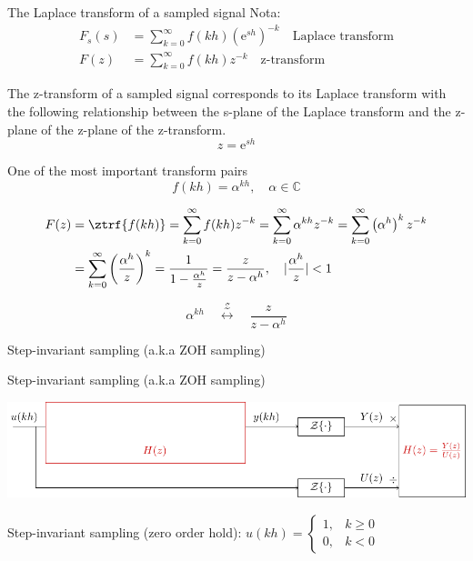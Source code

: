 \documentclass[presentation,aspectratio=169]{beamer}
\begin{document}
\begin{frame}[label={sec:orgb66f656}]{The Laplace transform of a sampled signal}
Nota:
\begin{align*}
F_s(s) &=  \sum_{k=0}^{\infty} f(kh) \left(\mathrm{e}^{sh}\right)^{-k}\quad \text{Laplace transform}\\
F(z) &= \sum_{k=0}^{\infty} f(kh) z^{-k} \quad \text{z-transform}
\end{align*}

\begin{tcolorbox}
 The z-transform of a sampled signal corresponds to its Laplace transform with the following relationship between the s-plane of the Laplace transform and the z-plane of the z-plane of the z-transform.
\[ z = \mathrm{e}^{sh}\]
\end{tcolorbox}
\end{frame}


\begin{frame}[label={sec:org09c424b}]{One of the most important transform pairs}
\[f(kh) = \alpha^{kh}, \quad \alpha \in \mathbb{C}\]

\pause

\begin{align*}
   F(z) &= \ztrf{f(kh)} = \sum_{k=0}^{\infty} f(kh)z^{-k}
   =  \sum_{k=0}^{\infty} \alpha^{kh}z^{-k} =  \sum_{k=0}^{\infty} \left(\alpha^{h}\right)^kz^{-k}\\
   &=  \sum_{k=0}^{\infty} \left(\frac{\alpha^{h}}{z}\right)^{k}
   =  \frac{1}{1 - \frac{\alpha^h}{z}} = \frac{z}{z-\alpha^{h}}, \quad |\frac{\alpha^h}{z}| < 1
\end{align*}

\pause

\begin{tcolorbox}
\[ \alpha^{kh} \quad  \overset{\mathcal{Z}}{\longleftrightarrow} \quad \frac{z}{z-\alpha^h} \]
\end{tcolorbox}
\end{frame}


\begin{frame}[label={sec:org8287211}]{Step-invariant sampling (a.k.a ZOH sampling)}
\end{frame}

\begin{frame}[label={sec:org95fe03b}]{Step-invariant sampling (a.k.a ZOH sampling)}
\begin{center}
\includegraphics[width=0.9\linewidth]{../../figures/invariant-sampling-white.pdf}
\end{center}

\pause
Step-invariant sampling (zero order hold): \(u(kh) = \begin{cases} 1, & k \ge 0\\0, & k<0 \end{cases}\)
\end{frame}
\end{document}

